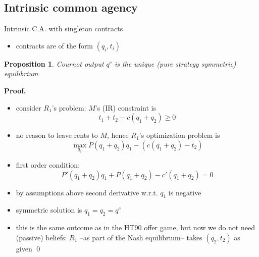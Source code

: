 \documentclass[11pt,english]{beamer}
\newtheorem{proposition}{Proposition}
\begin{document}
\subsection{Intrinsic common agency}

\begin{frame}[allowframebreaks]{Intrinsic C.A. with singleton contracts}
  \begin{itemize}
  \item contracts are of the form $(q_i,t_i)$
  \end{itemize}
  \begin{proposition}
    Cournot output $q^c$ is the unique (pure strategy symmetric)
    equilibrium
  \end{proposition}
  \textbf{Proof.}
    \begin{itemize}
    \item consider $R_1$'s problem: $M$'s (IR) constraint is
      \begin{equation}
        \label{eq:IRms03}
        t_1+t_2-c(q_1+q_2) \geq 0
      \end{equation}
    \item no reason to leave rents to $M$, hence $R_1$'s optimization
      problem is
      \begin{equation*}
        \max_{q_1} P(q_1+q_2)q_1 - (c(q_1+q_2)-t_2)
      \end{equation*}
    \item first order condition:
      \begin{equation*}
        P'(q_1+q_2)q_1+P(q_1+q_2)-c'(q_1+q_2) =0
      \end{equation*}
    \item by assumptions above second derivative w.r.t. $q_1$ is negative
    \item symmetric solution is $q_1=q_2=q^c$
    \item this is the same outcome as in the HT90 offer game, but now
      we do not need (passive) beliefs: $R_1$ --as part of the Nash
      equilibrium-- takes $(q_2,t_2)$ as given \qed
    \end{itemize}
\end{frame}
\end{document}
